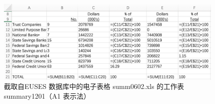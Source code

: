 \begin{figure}[tbp]    
    \centering
    \includegraphics[width=\textwidth]{figure/style-A1.png}
    \caption{截取自EUSES 数据库中的电子表格 summ0602.xls 的工作表summary1201（A1 表示法）}
    \label{figure-A1}
\end{figure}